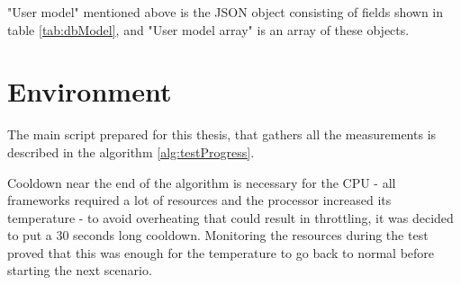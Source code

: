 "User model" mentioned above is the JSON object consisting of fields shown in table \ref{tab:dbModel}, and "User model array" is an array of these objects.

\section{Environment}\label{sec:mainScript}

The main script prepared for this thesis, that gathers all the measurements is described in the algorithm \ref{alg:testProgress}.



Cooldown near the end of the algorithm is necessary for the CPU - all frameworks required a lot of resources and the processor increased its temperature - to avoid overheating that could result in throttling, it was decided to put a 30 seconds long cooldown. Monitoring the resources during the test proved that this was enough for the temperature to go back to normal before starting the next scenario.
